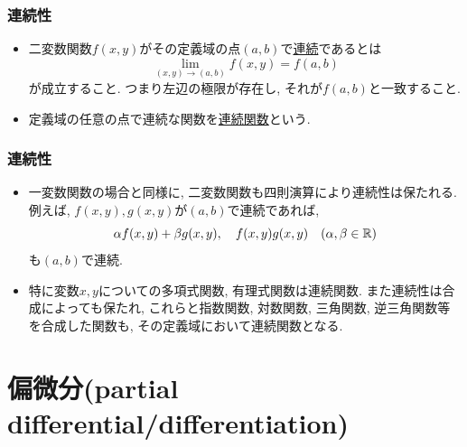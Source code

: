 \begin{frame}
\frametitle{連続性}


\begin{Def}
\begin{itemize}
\item 二変数関数$f(x,y)$がその定義域の点$(a,b)$で\underline{連続}であるとは
$$
\lim_{(x,y)\to (a,b)}f(x,y) = f(a,b)
$$
が成立すること. つまり左辺の極限が存在し, それが$f(a,b)$と一致すること. 
\item 定義域の任意の点で連続な関数を\underline{連続関数}という. 
\end{itemize}
\end{Def}

\end{frame}









\begin{frame}
\frametitle{連続性}

\begin{itemize}
\item 一変数関数の場合と同様に, 二変数関数も四則演算により連続性は保たれる. 
例えば, $f(x,y),g(x,y)$が$(a,b)$で連続であれば, 
$$
\alpha f(x,y)+\beta g(x,y), \ \ \ f(x,y)g(x,y) \ \ \ (\alpha,\beta \in \R)
$$
も$(a,b)$で連続. 
\item 特に変数$x,y$についての多項式関数, 有理式関数は連続関数.  
また連続性は合成によっても保たれ, これらと指数関数, 対数関数, 三角関数, 逆三角関数等を合成した関数も, その定義域において連続関数となる.　 
\end{itemize}

\end{frame}





\section{偏微分(partial differential/differentiation)}


